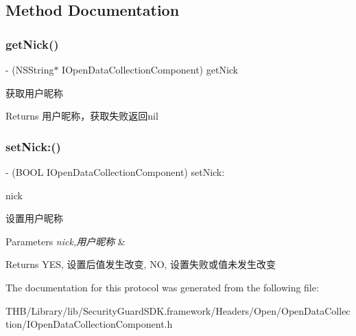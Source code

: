 \subsection{Method Documentation}
\mbox{\label{protocol_i_open_data_collection_component_01-p_a375d70c4b83bacf2c45f20976ee21a35}} 
\subsubsection{\texorpdfstring{get\+Nick()}{getNick()}}
{\footnotesize\ttfamily -\/ (N\+S\+String$\ast$ I\+Open\+Data\+Collection\+Component) get\+Nick \begin{DoxyParamCaption}{ }\end{DoxyParamCaption}}

获取用户昵称

\begin{DoxyReturn}{Returns}
用户昵称，获取失败返回nil 
\end{DoxyReturn}
\mbox{\label{protocol_i_open_data_collection_component_01-p_a6c4f1662e97a2074c7e6f2fa9cb2ed9c}} 
\subsubsection{\texorpdfstring{set\+Nick\+:()}{setNick:()}}
{\footnotesize\ttfamily -\/ (B\+O\+OL I\+Open\+Data\+Collection\+Component) set\+Nick\+: \begin{DoxyParamCaption}\item[{(N\+S\+String $\ast$)}]{nick }\end{DoxyParamCaption}}

设置用户昵称 
\begin{DoxyParams}{Parameters}
{\em nick,用户昵称} & \\
\hline
\end{DoxyParams}
\begin{DoxyReturn}{Returns}
Y\+ES, 设置后值发生改变, NO, 设置失败或值未发生改变 
\end{DoxyReturn}


The documentation for this protocol was generated from the following file\+:\begin{DoxyCompactItemize}
\item 
T\+H\+B/\+Library/lib/\+Security\+Guard\+S\+D\+K.\+framework/\+Headers/\+Open/\+Open\+Data\+Collection/I\+Open\+Data\+Collection\+Component.\+h\end{DoxyCompactItemize}
